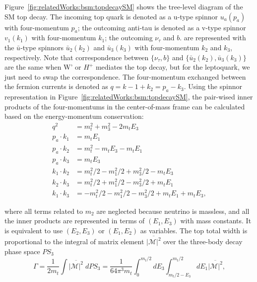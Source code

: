 Figure~\ref{fig:relatedWorks:bsm:topdecaySM} shows the tree-level diagram of the SM top decay. The incoming top quark is denoted as a u-type spinnor $u_a(p_a)$ with four-momentum $p_a$; the outcoming anti-tau is denoted as a v-type spinnor $v_1(k_1)$ with four-momentum $k_1$; the outcoming  $\nu_\tau$ and $b$. are represented with the $\bar{u}$-type spinnors $\bar{u}_2(k_2)$ and $\bar{u}_3(k_3)$ with four-momentum $k_2$ and $k_3$, respectively. Note that correspondence between  $\{\nu_\tau,b\}$ and $\{ \bar{u}_2(k_2), \bar{u}_3(k_3)\}$ are the same when W' or $H^+$ mediates the top decay, but for the leptoquark, we just need to swap the correspondence. The four-momentum exchanged between the fermion currents is denoted as $q=k-1+k_2 = p_a - k_3$. Using the spinnor representation in Figure~\ref{fig:relatedWorks:bsm:topdecaySM}, the pair-wised inner products of the four-momentums in the center-of-mass frame can be calculated based on the energy-momentum conservation:
\begin{equation}
\begin{split}
	q^2 &=  m_t^2 + m_3^2  -2 m_t E_3  \\
    p_a \cdot k_1 &= m_t E_1 \\
    p_a \cdot k_2 &= m_t^2  -m_t E_3-m_t E_1  \\
    p_a \cdot k_3 &= m_t E_3 \\
    k_1 \cdot k_2 &= m_t^2/2 - m_1^2/2 + m_3^2/2 - m_t E_3 \\
    k_2\cdot k_3 &=  m_t^2/2 + m_1^2/2 - m_3^2/2 + m_t E_1 \\
    k_1\cdot k_3 &=   -m_t^2/2 - m_1^2/2 - m_3^2/2 + m_t E_1 + m_t E_3 ,
\end{split}
\label{eqn:relatedWorks:bsm:innerProduct}
\end{equation}

\noindent where all terms related to $m_2$ are neglected because neutrino is massless, and all the inner products are represented in terms of $ ( E_1,E_3 )$ with mass constants. It is equivalent to use $ ( E_2,E_3 )$ or $ ( E_1,E_2 )$ as variables. The top total width is proportional to the integral of matrix element $\overline{ |\mathcal{M}|^2 } $ over the three-body decay phase space $PS_3$
\begin{equation}
	\Gamma = \frac{1}{2 m_t} \int \overline{ |\mathcal{M}|^2 } \; dPS_3 = \frac{1}{64 \pi^3 m_t} \int_{0}^{m_t/2} dE_3 \int_{m_t/2-E_3}^{m_t/2} dE_1 \overline{ |\mathcal{M}|^2 } ,
    \label{eqn:relatedWorks:bsm:decayWidth}
\end{equation}




